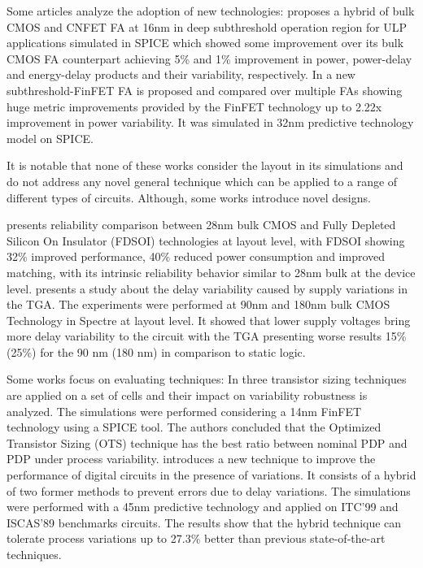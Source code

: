 \documentclass[pgmicro,diss,english]{iiufrgs}
\begin{document}
Some articles analyze the adoption of new technologies: \cite{guduri2015design} proposes a hybrid of bulk CMOS and CNFET FA at 16nm in deep subthreshold operation region for ULP applications simulated in SPICE which showed some improvement over its bulk CMOS FA counterpart achieving 5\% and 1\% improvement in power, power-delay and energy-delay products and their variability, respectively. In \cite{islam2011variability} a new subthreshold-FinFET FA is proposed and compared over multiple FAs showing huge metric improvements provided by the FinFET technology up to 2.22x improvement in power variability. It was simulated in 32nm predictive technology model on SPICE.

It is notable that none of these works consider the layout in its simulations and do not address any novel general technique which can be applied to a range of different types of circuits. Although, some works introduce novel designs.

\cite{federspiel201228nm} presents reliability comparison between 28nm bulk CMOS and Fully Depleted Silicon On Insulator (FDSOI) technologies at layout level, with FDSOI showing 32\% improved performance, 40\% reduced power consumption and improved matching, with its intrinsic reliability behavior similar to 28nm bulk at the device level. \cite{alioto2007delay} presents a study about the delay variability caused by supply variations in the TGA. The experiments were performed at 90nm and 180nm bulk CMOS Technology in Spectre at layout level. It showed that lower supply voltages bring more delay variability to the circuit with the TGA presenting worse results 15\% (25\%) for the 90 nm (180 nm) in comparison to static logic.


Some works focus on evaluating techniques: In \cite{zimpeck2016finfet} three transistor sizing techniques are applied on a set of cells and their impact on variability robustness is analyzed. The simulations were performed considering a 14nm FinFET technology using a SPICE tool. The authors concluded that the Optimized Transistor Sizing (OTS) technique has the best ratio between nominal PDP and PDP under process variability. \cite{ahmadi2017hybrid} introduces a new technique to improve the performance of digital circuits in the presence of variations. It consists of a hybrid of two former methods to prevent errors due to delay variations. The simulations were performed with a 45nm predictive technology and applied on ITC’99 and ISCAS’89 benchmarks circuits. The results show that the hybrid technique can tolerate process variations up to 27.3\% better than previous state-of-the-art techniques.
\end{document}
